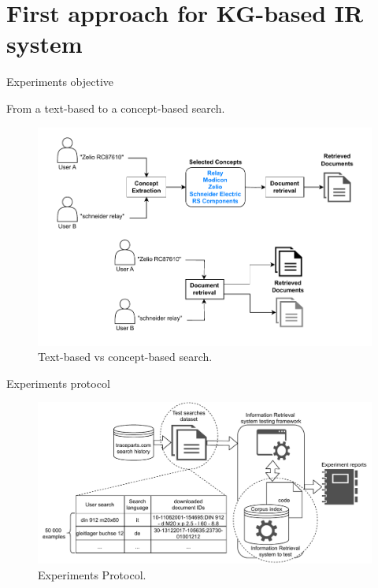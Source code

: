 \section{First approach for KG-based IR system}

\begin{frame}{Experiments objective}

    \begin{center}
        From a text-based to a concept-based search.
    \end{center}

    \begin{figure} [H]
        \begin{center}
            \includegraphics[scale=0.6]{images/text-vs-concept-based-search.pdf} 
            \caption{Text-based vs concept-based search.} 
        \end{center}
    \end{figure}

\end{frame}

\begin{frame}{Experiments protocol}

    \begin{figure} [H]
        \begin{center}
            \includegraphics[scale=0.6]{images/tp-search-expe-setting.pdf} 
            \caption{Experiments Protocol.} 
        \end{center}
    \end{figure}

\end{frame}

